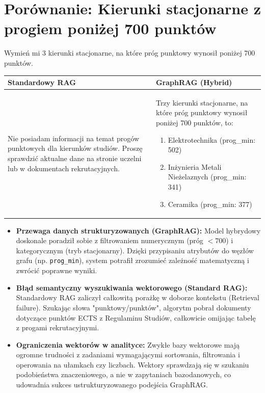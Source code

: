 \newpage

\section*{Porównanie: Kierunki stacjonarne z progiem poniżej 700 punktów}

\begin{tcolorbox}[colback=blue!5!white,colframe=blue!75!black,title=Pytanie użytkownika]
    Wymień mi 3 kierunki stacjonarne, na które próg punktowy wynosił poniżej 700 punktów.
\end{tcolorbox}

\noindent
\begin{tabularx}{\textwidth}{@{} XX @{}}
    \toprule
    \textbf{Standardowy RAG} & \textbf{GraphRAG (Hybrid)} \\
    \midrule
    \small 
    Nie posiadam informacji na temat progów punktowych dla kierunków studiów. Proszę sprawdzić aktualne dane na stronie uczelni lub w dokumentach rekrutacyjnych.
    & 
    \small 
    Trzy kierunki stacjonarne, na które próg punktowy wynosił poniżej 700 punktów, to:
    \begin{enumerate}
        \item Elektrotechnika (prog\_min: 502)
        \item Inżynieria Metali Nieżelaznych (prog\_min: 341)
        \item Ceramika (prog\_min: 377)
    \end{enumerate} \\
    \bottomrule
\end{tabularx}

\begin{tcolorbox}[colback=green!5!white,colframe=green!50!black,title=Wnioski i obserwacje]
    \begin{itemize}
        \item \textbf{Przewaga danych strukturyzowanych (GraphRAG):} Model hybrydowy doskonale poradził sobie z filtrowaniem numerycznym (próg $<700$) i kategorycznym (tryb stacjonarny). Dzięki przypisaniu atrybutów do węzłów grafu (np. \texttt{prog\_min}), system potrafił zrozumieć zależność matematyczną i zwrócić poprawne wyniki.
        \item \textbf{Błąd semantyczny wyszukiwania wektorowego (Standard RAG):} Standardowy RAG zaliczył całkowitą porażkę w doborze kontekstu (Retrieval failure). Szukając słowa "punktowy/punktów", algorytm pobrał dokumenty dotyczące punktów ECTS z Regulaminu Studiów, całkowicie omijając tabelę z progami rekrutacyjnymi.
        \item \textbf{Ograniczenia wektorów w analityce:} Zwykłe bazy wektorowe mają ogromne trudności z zadaniami wymagającymi sortowania, filtrowania i operowania na ułamkach czy liczbach. Wektory sprawdzają się w szukaniu podobieństwa znaczeniowego, a nie w zapytaniach bazodanowych, co udowadnia sukces ustrukturyzowanego podejścia GraphRAG.
    \end{itemize}
\end{tcolorbox}
\vspace{1em}

